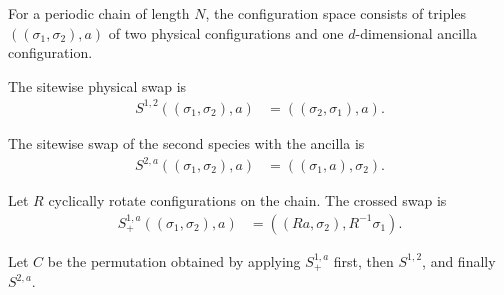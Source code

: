 \begin{definition}
    \label{def:mpu_shift_ancilla_config}
    \leanok
    For a periodic chain of length $N$, the configuration space consists of
    triples $((\sigma_1,\sigma_2),a)$ of two physical configurations and one
    $d$-dimensional ancilla configuration.
\end{definition}

\begin{definition}
    \label{def:mpu_shift_ancilla_swap_12}
    \leanok
    The sitewise physical swap is
    \begin{align}
        S^{1,2}((\sigma_1,\sigma_2),a)
         & =((\sigma_2,\sigma_1),a).
    \end{align}
\end{definition}

\begin{definition}
    \label{def:mpu_shift_ancilla_swap_2a}
    \leanok
    The sitewise swap of the second species with the ancilla is
    \begin{align}
        S^{2,a}((\sigma_1,\sigma_2),a)
         & =((\sigma_1,a),\sigma_2).
    \end{align}
\end{definition}

\begin{definition}
    \label{def:mpu_shift_ancilla_swap_1a_next}
    \leanok
    Let $R$ cyclically rotate configurations on the chain. The crossed swap is
    \begin{align}
        S^{1,a}_{+}((\sigma_1,\sigma_2),a)
         & =((Ra,\sigma_2),R^{-1}\sigma_1).
    \end{align}
\end{definition}

\begin{definition}
    \label{def:mpu_shift_ancilla_three_swap}
    \leanok
    Let $C$ be the permutation obtained by applying $S^{1,a}_{+}$ first, then
    $S^{1,2}$, and finally $S^{2,a}$.
\end{definition}

